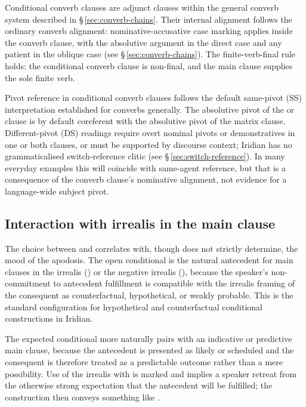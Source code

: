 Conditional converb clauses are adjunct clauses within the general converb
system described in §\,\ref{sec:converb-chains}. Their internal alignment
follows the ordinary converb alignment: nominative-accusative case marking
applies inside the converb clause, with the absolutive argument in the
direct case and any patient in the oblique case (see
§\,\ref{sec:converb-chains}). The finite-verb-final rule holds: the
conditional converb clause is non-final, and the main clause supplies the
sole finite verb.

Pivot reference in conditional converb clauses follows the default same-pivot
(SS) interpretation established for converbs generally. The absolutive pivot of
the  or  clause is by default coreferent with the
absolutive pivot of the matrix clause. Different-pivot (DS) readings require
overt nominal pivots or demonstratives in one or both clauses, or must be
supported by discourse context; Iridian has no grammaticalised switch-reference
clitic (see §\,\ref{sec:switch-reference}). In many everyday examples this will
coincide with same-agent reference, but that is a consequence of the converb
clause's nominative alignment, not evidence for a language-wide subject pivot.

\subsection{Interaction with irrealis in the main clause}\label{sec:cond-irrealis}

The choice between  and  correlates with, though
does not strictly determine, the mood of the apodosis. The open
conditional  is the natural antecedent for main clauses in the
irrealis () or the negative irrealis (), because the
speaker's non-commitment to antecedent fulfillment is compatible with the
irrealis framing of the consequent as counterfactual, hypothetical, or
weakly probable. This is the standard configuration for hypothetical and
counterfactual conditional constructions in Iridian.

The expected conditional  more naturally pairs with an
indicative or predictive main clause, because the antecedent is presented
as likely or scheduled and the consequent is therefore treated as a
predictable outcome rather than a mere possibility. Use of the irrealis
with  is marked and implies a speaker retreat from the
otherwise strong expectation that the antecedent will be fulfilled; the
construction then conveys something like .

